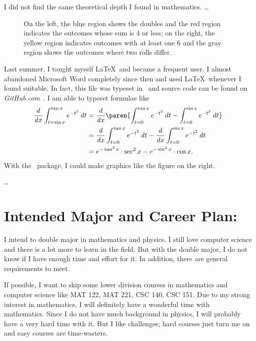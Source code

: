 	I did not find the same theoretical depth I found in mathematics.
	\dots
	
	\begin{wrapfigure}[8]{r}[.6in]{.4\textwidth}
		\scalebox{.4}{  }
		\caption{On the left, the blue region shows the doubles and the red region indicates the outcomes whose sum is 4 or less; on the right, the yellow region indicates outcomes with at least one 6 and the gray region shows the outcomes where two rolls differ.}
		\label{fig:CondProbEx}
	\end{wrapfigure}
	
	Last summer, I taught myself \LaTeX\ and became a frequent user. I almost abandoned Microsoft Word completely since then and used \LaTeX\ whenever I found suitable. In fact, this file was typeset in \LuaLaTeX\ and source code can be found on \textit{GitHub.com}~\cite{Readmission}. I am able to typeset formulae like
	\begin{align*}
	\dd x \int_{t=\sin x}^{\tan x} e^{-t^2} \dt
		&= \dd x \paren{\int_{t=0}^{\tan x} e^{-t^2} \dt -
			\int_{t=0}^{\sin x} e^{-t^2} \dt} \\
		&= \dd x \int_{t=0}^{\tan x} e^{-t^2} \dt
			- \dd x \int_{t=0}^{\sin x} e^{-t^2} \dt \\
		&= e^{-\tan^2 x} \cdot \sec^2 x - e^{-\sin^2 x} \cdot \cos x.
	\end{align*}
	With the \TikZ\ package, I could make graphics like the figure on the right.
	
	\dots
	
	\section*{Intended Major and Career Plan:}
	I intend to double major in mathematics and physics. I still love computer science and there is a lot more to learn in the field. But with the double major, I do not know if I have enough time and effort for it. In addition, there are general requirements to meet.
	
	If possible, I want to skip some lower division courses in mathematics and computer science like MAT 122, MAT 221, CSC 140, CSC 151. Due to my strong interest in mathematics, I will definitely have a wonderful time with mathematics. Since I do not have much background in physics, I will probably have a very hard time with it. But I like challenges; hard courses just turn me on and easy courses are time-wasters.
	
